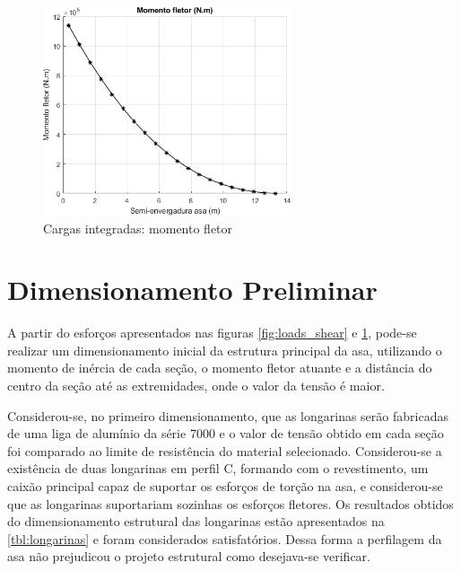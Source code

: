 \begin{figure}[H]
\centering
\includegraphics[width=0.65\textwidth]{images/parte3/loads_bending.png}
\caption{Cargas integradas: momento fletor}
\label{fig:loads_bending}
\end{figure}


\clearpage
\section{Dimensionamento Preliminar}

A partir do esforços apresentados nas figuras \ref{fig:loads_shear} e \ref{fig:loads_bending}, pode-se realizar um dimensionamento inicial da estrutura principal da asa, utilizando o momento de inércia de cada seção, o momento fletor atuante e a distância do centro da seção até as extremidades, onde o valor da tensão é maior.

Considerou-se, no primeiro dimensionamento, que as longarinas serão fabricadas de uma liga de alumínio da série 7000 e o valor de tensão obtido em cada seção foi comparado ao limite de resistência do material selecionado.
Considerou-se a existência de duas longarinas em perfil C, formando com o revestimento, um caixão principal capaz de suportar os esforços de torção na asa, e considerou-se que as longarinas suportariam sozinhas os esforços fletores.
Os resultados obtidos do dimensionamento estrutural das longarinas estão apresentados na \autoref{tbl:longarinas} e foram considerados satisfatórios.
Dessa forma a perfilagem da asa não prejudicou o projeto estrutural como desejava-se verificar.


